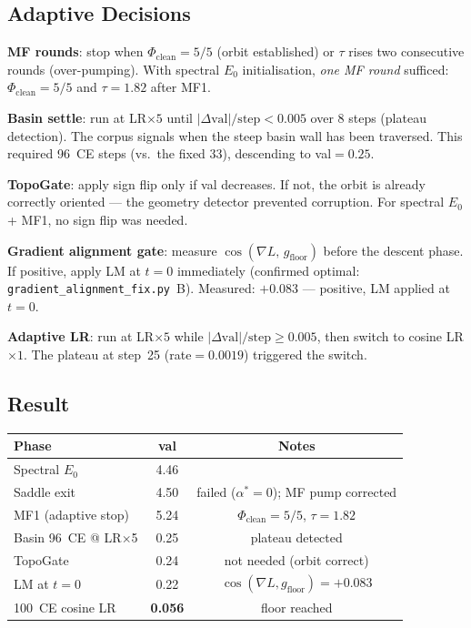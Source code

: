 \documentclass[11pt]{amsart}
\begin{document}
\subsection{Adaptive Decisions}

\textbf{MF rounds}: stop when $\Phi_\mathrm{clean}=5/5$
(orbit established) or $\tau$ rises two consecutive rounds (over-pumping).
With spectral $E_0$ initialisation, \emph{one MF round} sufficed:
$\Phi_\mathrm{clean}=5/5$ and $\tau=1.82$ after MF1.

\textbf{Basin settle}: run at LR$\times 5$ until
$|\Delta\mathrm{val}|/\mathrm{step} < 0.005$ over 8 steps (plateau detection).
The corpus signals when the steep basin wall has been traversed.
This required 96~CE steps (vs.\ the fixed 33), descending to val$=0.25$.

\textbf{TopoGate}: apply sign flip only if val decreases.
If not, the orbit is already correctly oriented ---
the geometry detector prevented corruption.
For spectral $E_0$ + MF1, no sign flip was needed.

\textbf{Gradient alignment gate}: measure
$\cos(\nabla L,\, g_\mathrm{floor})$ before the descent phase.
If positive, apply LM at $t=0$ immediately
(confirmed optimal: \texttt{gradient\_alignment\_fix.py}~B).
Measured: $+0.083$ --- positive, LM applied at $t=0$.

\textbf{Adaptive LR}: run at LR$\times 5$ while
$|\Delta\mathrm{val}|/\mathrm{step} \geq 0.005$,
then switch to cosine LR$\times 1$.
The plateau at step~25 (rate$=0.0019$) triggered the switch.

\subsection{Result}

\begin{center}
\small
\begin{tabular}{lcc}
\toprule
Phase & val & Notes \\
\midrule
Spectral $E_0$ & 4.46 & \\
Saddle exit & 4.50 & failed ($\alpha^*=0$); MF pump corrected \\
MF1 (adaptive stop) & 5.24 & $\Phi_\mathrm{clean}=5/5$, $\tau=1.82$ \\
Basin 96~CE @ LR$\times$5 & 0.25 & plateau detected \\
TopoGate & 0.24 & not needed (orbit correct) \\
LM at $t=0$ & 0.22 & $\cos(\nabla L, g_\mathrm{floor})=+0.083$ \\
100~CE cosine LR & \textbf{0.056} & floor reached \\
\bottomrule
\end{tabular}
\end{center}
\end{document}
